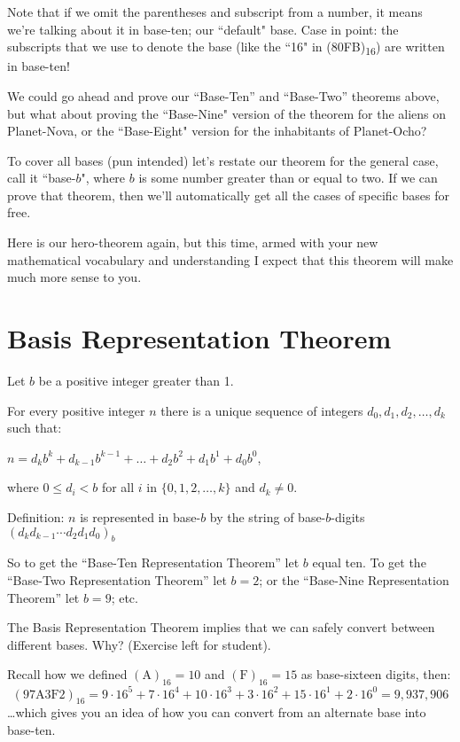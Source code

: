 \documentclass{article}
\newenvironment{jprIn}{\begin{adjustwidth}{2em}{}}{\end{adjustwidth}}
\begin{document}
Note that if we omit the parentheses and subscript from a number,
it means we're talking about it in base-ten; our ``default" base.
Case in point: the subscripts that we use to denote the base
(like the ``16" in (80FB)\textsubscript{16}) are written in base-ten!

We could go ahead and prove our ``Base-Ten'' and ``Base-Two'' theorems above,
but what about proving the ``Base-Nine" version of the theorem for the aliens on Planet-Nova,
or the ``Base-Eight" version for the inhabitants of Planet-Ocho?

To cover all bases (pun intended) let's restate our theorem for the general case,
call it ``base-$b$",
where $b$ is some number greater than or equal to two.
If we can prove that theorem,
then we'll automatically get all the cases of specific bases for free.

Here is our hero-theorem again, but this time, armed with your new mathematical 
vocabulary and
understanding I expect that this theorem will make much more sense to you.

\section*{Basis Representation Theorem}
\begin{jprIn}
Let $b$ be a positive integer greater than 1.

For every positive integer $n$ there is a unique sequence
of integers $d_0, d_1, d_2,\dots{},d_k$ such that:

\hspace{3em}$n=d_kb^k+d_{k-1}b^{k-1}+\dots+d_2b^2+d_1b^1+d_0b^0$,

where $0\le{}d_i<b$ for all $i$ in $\{0,1,2,\dots{},k\}$ and $d_k\ne0$.

Definition: $n$ is represented in base-$b$ by the string
of base-$b$-digits $(d_kd_{k-1}{\cdots}d_2d_1d_0)_b$
\end{jprIn}
\bigskip

So to get the ``Base-Ten Representation Theorem'' let $b$ equal ten.
To get the ``Base-Two Representation Theorem'' let $b=2$; or the ``Base-Nine Representation Theorem''
let $b=9$; etc.

\bigskip
The Basis Representation Theorem
implies that we can safely convert between
different bases. Why? (Exercise left for student).

Recall how we defined $(\text{A})_{16}=10$
and $(\text{F})_{16}=15$ as base-sixteen digits, then:
\[
(\text{97A3F2})_{16}
=9\cdot{}16^5
+7\cdot{}16^4
+10\cdot{}16^3
+3\cdot{}16^2
+15\cdot{}16^1
+2\cdot{}16^0
=9,937,906\]
\dots{}which gives you an idea of how you can convert from an alternate base into base-ten.
\end{document}
